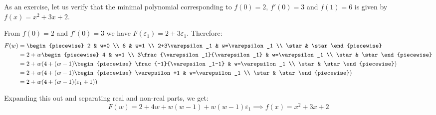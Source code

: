 \begin{example}
    As an exercise, let us verify that the minimal polynomial corresponding to $f(0)=2$, $f'(0)=3$ and $f(1)=6$ is given by $f(x)=x^2+3x+2$.

    From $f(0)=2$ and $f'(0)=3$ we have $F(\varepsilon_1)=2+3\varepsilon_1$. Therefore:
    \begin{align*}
        F(w) &= \begin{piecewise}
            2 & w=0 \\
            6 & w=1 \\
            2+3\varepsilon_1 & w=\varepsilon_1 \\
            \star & \star
        \end{piecewise} \\
        &= 2+w\begin{piecewise}
            4 & w=1 \\
            3\frac{\varepsilon_1}{\varepsilon_1} & w=\varepsilon_1 \\
            \star & \star
        \end{piecewise} \\
        &= 2+w\paren*{4+(w-1)\begin{piecewise}
            \frac{-1}{\varepsilon_1-1} & w=\varepsilon_1 \\
            \star & \star
        \end{piecewise}} \\
        &= 2+w\paren*{4+(w-1)\begin{piecewise}
            \varepsilon+1 & w=\varepsilon_1 \\
            \star & \star
        \end{piecewise}} \\
        &= 2+w\paren*{4+(w-1)(\varepsilon_1+1)}
    \end{align*}

    Expanding this out and separating real and non-real parts, we get:
    $$
        F(w)=2+4w+w(w-1)+w(w-1)\varepsilon_1 \implies f(x)=x^2+3x+2
    $$
\end{example}

